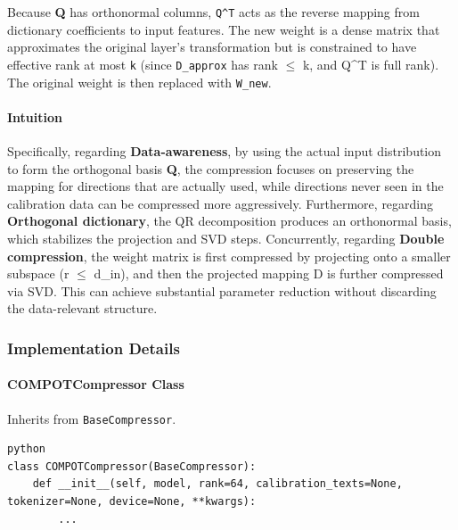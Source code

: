 Because \textbf{Q} has orthonormal columns, \texttt{Q\textasciicircum{}T} acts as the reverse mapping from dictionary coefficients to input features. The new weight is a dense matrix that approximates the original layer's transformation but is constrained to have effective rank at most \texttt{k} (since \texttt{D\_approx} has rank $\le$ k, and Q\textasciicircum{}T is full rank). The original weight is then replaced with \texttt{W\_new}.

\paragraph{Intuition}

Specifically, regarding \textbf{Data-awareness}, by using the actual input distribution to form the orthogonal basis \textbf{Q}, the compression focuses on preserving the mapping for directions that are actually used, while directions never seen in the calibration data can be compressed more aggressively. Furthermore, regarding \textbf{Orthogonal dictionary}, the QR decomposition produces an orthonormal basis, which stabilizes the projection and SVD steps. Concurrently, regarding \textbf{Double compression}, the weight matrix is first compressed by projecting onto a smaller subspace (r $\le$ d\_in), and then the projected mapping D is further compressed via SVD. This can achieve substantial parameter reduction without discarding the data-relevant structure.



\subsubsection*{Implementation Details}

\paragraph{COMPOTCompressor Class}

Inherits from \texttt{BaseCompressor}.

\vspace{0.5em}
\begin{mdframed}[backgroundcolor=codebg, linecolor=codeframe, linewidth=1pt, roundcorner=4pt, innerleftmargin=2pt, innerrightmargin=5pt, innertopmargin=5pt, innerbottommargin=5pt]
\begin{lstlisting}
python
class COMPOTCompressor(BaseCompressor):
    def __init__(self, model, rank=64, calibration_texts=None, tokenizer=None, device=None, **kwargs):
        ...
\end{lstlisting}
\end{mdframed}
\vspace{0.5em}

